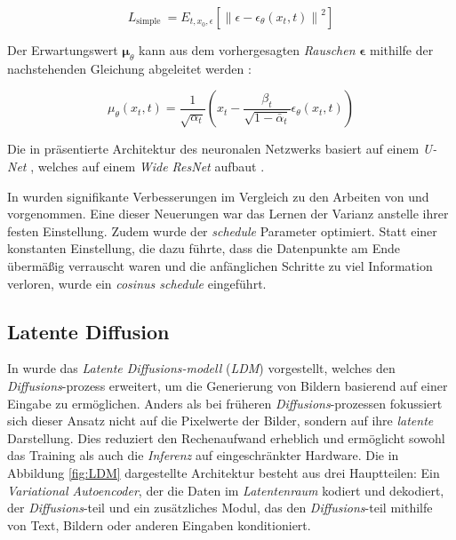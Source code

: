 \documentclass[
  a4paper,  %
  twoside,  %
  bibliography=totoc,
  headsepline,
  cleardoublepage=empty,
  parskip=half,
  draft=false
]{scrbook}
\begin{document}
\begin{equation}
    L_{\text {simple }}=E_{t, x_0, \epsilon}\left[\left\|\epsilon-\epsilon_\theta\left(x_t, t\right)\right\|^2\right]
\end{equation}

Der Erwartungswert $\boldsymbol{\mu}_\theta$ kann aus dem vorhergesagten \emph{Rauschen} $\boldsymbol{\epsilon}$ mithilfe der nachstehenden Gleichung abgeleitet werden \cite{ho_denoising_2020}:

\begin{equation}
    \mu_\theta\left(x_t, t\right)=\frac{1}{\sqrt{\alpha_t}}\left(x_t-\frac{\beta_t}{\sqrt{1-\bar{\alpha}_t}} \epsilon_\theta\left(x_t, t\right)\right)
\end{equation}

Die in \cite{ho_denoising_2020} präsentierte Architektur des neuronalen Netzwerks basiert auf einem \emph{U-Net} \cite{ronneberger_u-net_2015}, welches auf einem \emph{Wide ResNet} \cite{zagoruyko_wide_2017} aufbaut \cite{ho_denoising_2020}.

In \cite{nichol_improved_2021} wurden signifikante Verbesserungen im Vergleich zu den Arbeiten von \cite{sohl-dickstein_deep_2015} und \cite{ho_denoising_2020} vorgenommen. Eine dieser Neuerungen war das Lernen der Varianz anstelle ihrer festen Einstellung. Zudem wurde der \emph{schedule} Parameter optimiert. Statt einer konstanten Einstellung, die dazu führte, dass die Datenpunkte am Ende übermäßig verrauscht waren und die anfänglichen Schritte zu viel Information verloren, wurde ein \emph{cosinus schedule} eingeführt. \cite{nichol_improved_2021}

\subsection{Latente Diffusion}

In \cite{rombach_high-resolution_2022} wurde das \emph{Latente \emph{Diffusions}-modell} (\emph{LDM}) vorgestellt, welches den \emph{Diffusions}-prozess \cite{sohl-dickstein_deep_2015, ho_denoising_2020, nichol_improved_2021, dhariwal_diffusion_2021} erweitert, um die Generierung von Bildern basierend auf einer Eingabe zu ermöglichen. Anders als bei früheren \emph{Diffusions}-prozessen fokussiert sich dieser Ansatz nicht auf die Pixelwerte der Bilder, sondern auf ihre \emph{latente} Darstellung. Dies reduziert den Rechenaufwand erheblich und ermöglicht sowohl das Training als auch die \emph{Inferenz} auf eingeschränkter Hardware. Die in Abbildung \ref{fig:LDM} dargestellte Architektur besteht aus drei Hauptteilen: Ein \emph{Variational Autoencoder}, der die Daten im \emph{Latentenraum} kodiert und dekodiert, der \emph{Diffusions}-teil und ein zusätzliches Modul, das den \emph{Diffusions}-teil mithilfe von Text, Bildern oder anderen Eingaben konditioniert. \cite{rombach_high-resolution_2022}
\end{document}
